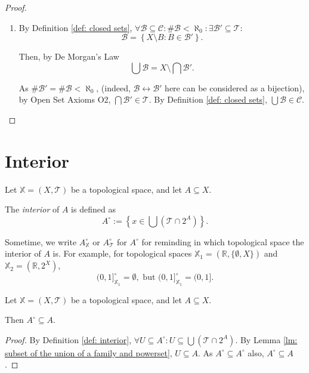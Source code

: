 \begin{lemma}
\begin{proof}
\begin{enumerate}[C1.]
			\item
			By Definition \ref{def: closed sets}, $\forall \mathcal B \subseteq \mathcal C: \#\mathcal B < \aleph_0: \exists \mathcal B' \subseteq \mathcal T:$
			$$
			\mathcal B = \left\{ X \setminus B : B \in \mathcal B' \right\}.
			$$
			
			Then, by De Morgan's Law
			$$
			\bigcup \mathcal B = X \setminus \bigcap \mathcal B'.
			$$
			
			As $\# \mathcal B' = \# \mathcal B < \aleph_0$, (indeed, $\mathcal B \leftrightarrow \mathcal B'$ here can be considered as a bijection), by Open Set Axioms O2, $\bigcap \mathcal B' \in \mathcal T$. By Definition \ref{def: closed sets}, $\bigcup \mathcal B \in \mathcal C$.
		\end{enumerate}
	\end{proof}
\end{lemma}


\section{Interior}


\begin{definition}
	\label{def: interior}
	
	Let $\mathbb X = (X, \mathcal T)$ be a topological space, and let $A \subseteq X$.
	
	The \textit{interior} of $A$ is defined as
	$$
	A^\circ := \left\{ x \in \bigcup (\mathcal T \cap 2^A) \right\}.
	$$
\end{definition}

\begin{note}
	Sometime, we write $A^\circ_\mathbb X$ or $A^\circ_\mathcal T$ for $A^\circ$ for reminding in which topological space the interior of $A$ is. For example, for topological spaces $\mathbb X_1 = (\mathbb R, \{\emptyset, X\})$ and $\mathbb X_2 = (\mathbb R, 2^X)$,
	$$
	(0,1]^\circ_{\mathbb X_1} = \emptyset, \text{ but } (0,1]^\circ_{\mathbb X_1} = (0,1].
	$$
\end{note}


\begin{lemma}
	\label{lm: interior: subset of the set}
	Let $\mathbb X = (X, \mathcal T)$ be a topological space, and let $A \subseteq X$.
	
	Then $A^\circ \subseteq A$.
	
	\begin{proof}
		By Definition \ref{def: interior}, $\forall U \subseteq A^\circ: U \subseteq \bigcup(\mathcal T \cap 2^A)$. By Lemma \ref{lm: subset of the union of a family and powerset}, $U \subseteq A$. As $A^\circ \subseteq A^\circ$ also, $A^\circ \subseteq A$.
	\end{proof}
\end{lemma}


